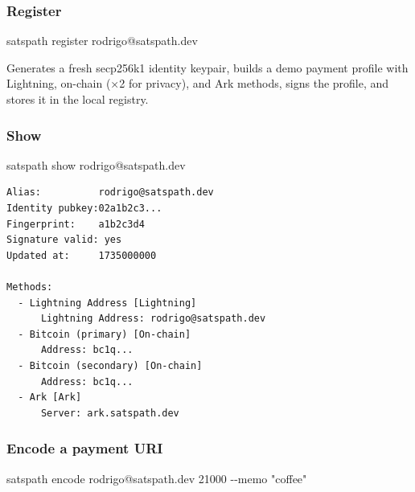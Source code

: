 \documentclass[
]{article}
\newenvironment{Shaded}{}{}
\newcommand{\AttributeTok}[1]{\textcolor[rgb]{0.49,0.56,0.16}{#1}}
\newcommand{\ExtensionTok}[1]{#1}
\newcommand{\NormalTok}[1]{#1}
\newcommand{\StringTok}[1]{\textcolor[rgb]{0.25,0.44,0.63}{#1}}
\begin{document}
\hypertarget{register}{%
\subsubsection{Register}\label{register}}

\begin{Shaded}
\begin{Highlighting}[]
\ExtensionTok{satspath}\NormalTok{ register rodrigo@satspath.dev}
\end{Highlighting}
\end{Shaded}

Generates a fresh secp256k1 identity keypair, builds a demo payment
profile with Lightning, on-chain (×2 for privacy), and Ark methods,
signs the profile, and stores it in the local registry.

\hypertarget{show}{%
\subsubsection{Show}\label{show}}

\begin{Shaded}
\begin{Highlighting}[]
\ExtensionTok{satspath}\NormalTok{ show rodrigo@satspath.dev}
\end{Highlighting}
\end{Shaded}

\begin{verbatim}
Alias:          rodrigo@satspath.dev
Identity pubkey:02a1b2c3...
Fingerprint:    a1b2c3d4
Signature valid: yes
Updated at:     1735000000

Methods:
  - Lightning Address [Lightning]
      Lightning Address: rodrigo@satspath.dev
  - Bitcoin (primary) [On-chain]
      Address: bc1q...
  - Bitcoin (secondary) [On-chain]
      Address: bc1q...
  - Ark [Ark]
      Server: ark.satspath.dev
\end{verbatim}

\hypertarget{encode-a-payment-uri}{%
\subsubsection{Encode a payment URI}\label{encode-a-payment-uri}}

\begin{Shaded}
\begin{Highlighting}[]
\ExtensionTok{satspath}\NormalTok{ encode rodrigo@satspath.dev 21000 }\AttributeTok{{-}{-}memo} \StringTok{"coffee"}
\end{Highlighting}
\end{Shaded}
\end{document}

